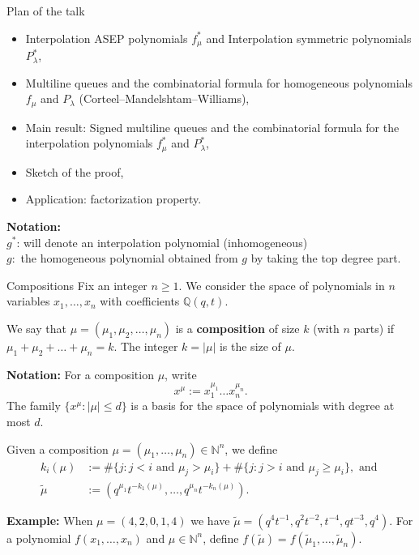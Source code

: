 \documentclass[10pt]{beamer}
\newcommand{\QQ}{\mathbb Q}
\newcommand{\NN}{\mathbb N}
\theoremstyle{definition}
\theoremstyle{remark}
\begin{document}
\begin{frame}{Plan of the talk}

    \begin{itemize}
        \item  Interpolation ASEP polynomials $f^*_\mu$ and Interpolation symmetric polynomials $P^*_\lambda$,
        \item Multiline queues and the combinatorial formula for homogeneous polynomials $f_\mu$ and $P_\lambda$ (Corteel--Mandelshtam--Williams),
        \item Main result: Signed multiline queues and the combinatorial formula for the interpolation polynomials $f^*_\mu$ and $P^*_\lambda$,
        \item Sketch of the proof,
        \item Application: factorization property.
    \end{itemize}


\textbf{Notation:}\\
$g^*$: will denote an interpolation polynomial (inhomogeneous)\\
$g:$ the homogeneous polynomial obtained from $g$ by taking the top degree part.
\end{frame}






\begin{frame}{Compositions}
Fix an integer $n\geq 1$. 
We consider the space of polynomials in $n$ variables $x_1,\dots, x_n$ with coefficients $\QQ(q,t)$.

We say that
       $\mu=(\mu_1,\mu_2,\dots,\mu_{n})$ is a \textbf{composition} of size $k$ (with $n$ parts) if $\mu_1+\mu_2+\dots +\mu_n=k$.
The integer $k=|\mu|$ is the size of $\mu$.

\textbf{\textcolor{uibred}{Notation:}} For a composition $\mu$, write
$$x^\mu:=x_1^{\mu_1}\dots x_n^{\mu_n}.$$
The family 
$\{x^\mu:\text{$|\mu|\leq d$}\}$ is a basis for the space of polynomials with degree at most $d$.
\vspace{-0.1cm}
\pause

Given a composition $\mu=(\mu_1,\dots,\mu_n)\in\NN^n$, we define
\begin{align*}
k_i(\mu)&:=\#\{j:j<i \text{ and }\mu_j>\mu_i\}+\#\{j:j>i \text{ and }\mu_j\geq \mu_i\}, \text{ and }\\
\widetilde\mu&:=\left(q^{\mu_1} t^{-k_1(\mu)},\dots,q^{\mu_n} t^{-k_n(\mu)}\right).
\end{align*}
\vspace{-1cm}

\textbf{\textcolor{uibred}{Example:}} When $\mu=(4,2,0,1,4)$ we have
    $\widetilde \mu=(q^4t^{-1},q^2t^{-2},t^{-4},qt^{-3},q^4)$.
For a polynomial $f(x_1,\dots,x_n)$ and $\mu\in \NN^n$, define $f(\widetilde{\mu})=f(\widetilde{\mu}_1,\dots,\widetilde{\mu}_n)$.


  
\end{frame}
\end{document}
